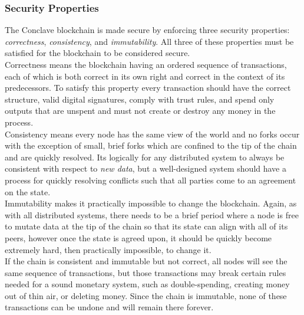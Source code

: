 \documentclass{report}
\begin{document}
			\subsubsection{Security Properties}
				The Conclave blockchain is made secure by enforcing three security properties: \textit{correctness}, \textit{consistency}, and \textit{immutability}. All three of these properties must be satisfied for the blockchain to be considered secure. \\

				Correctness means the blockchain having an ordered sequence  of transactions, each of which is both correct in its own right and correct in the context of its predecessors. To satisfy this property every transaction should have the correct structure, valid digital signatures,  comply with trust rules, and spend only outputs that are unspent and must not create or destroy any money in the process. \\

				Consistency means every node has the same view of the world and no forks occur with the exception of small, brief forks  which are confined to the tip of the chain  and are quickly resolved. Its logically for any distributed system  to always be consistent with respect to \textit{new data}, but a well-designed system should have a process for quickly resolving conflicts  such that all parties come to an agreement on the state. \\

				Immutability makes it practically impossible to change the blockchain. Again, as with all distributed systems, there needs to be a brief period where a node is free to mutate data  at the tip of the chain so that its state can align with all of its peers, however once the state is agreed upon, it should be quickly become extremely hard, then practically impossible, to change it. \\

				If the chain is consistent and immutable but not correct, all nodes will see the same sequence of transactions, but those transactions may break certain rules needed for a sound monetary system, such as double-spending, creating money out of thin air, or deleting money. Since the chain is immutable, none of these transactions can be undone and will remain there forever. \\
\end{document}
